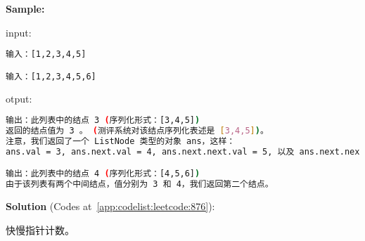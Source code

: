 \textbf{Sample:}\par

input:\par

\begin{lstlisting}[language=bash]
输入：[1,2,3,4,5]

输入：[1,2,3,4,5,6]
\end{lstlisting}

otput:\par

\begin{lstlisting}[language=bash]
输出：此列表中的结点 3 (序列化形式：[3,4,5])
返回的结点值为 3 。 (测评系统对该结点序列化表述是 [3,4,5])。
注意，我们返回了一个 ListNode 类型的对象 ans，这样：
ans.val = 3, ans.next.val = 4, ans.next.next.val = 5, 以及 ans.next.next.next = NULL.

输出：此列表中的结点 4 (序列化形式：[4,5,6])
由于该列表有两个中间结点，值分别为 3 和 4，我们返回第二个结点。
\end{lstlisting}

\textbf{Solution }(Codes at~\ref{app:codelist:leetcode:876}):\par

快慢指针计数。\par



